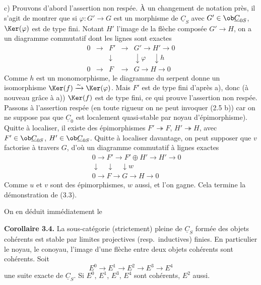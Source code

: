 c) Prouvons d'abord l'assertion non respée. À un changement de notation près, il s'agit de montrer que si $\varphi : G' \to G$ est un morphisme de $\underline{C}_S$ avec $G' \in \ob \underline{C}_{0S}$, $\Ker(\varphi)$ est de type fini. Notant $H'$ l'image de la flèche composée $G' \to H$, on a un diagramme commutatif dont les lignes sont exactes
\[
\begin{array}{ccccc}
0 & \longrightarrow & F' & \longrightarrow & G' \longrightarrow H' \longrightarrow 0 \\
& & \downarrow & & \downarrow \varphi \quad \downarrow h \\
0 & \longrightarrow & F & \longrightarrow & G \longrightarrow H \longrightarrow 0
\end{array}
\]
Comme $h$ est un monomorphisme, le diagramme du serpent donne un isomorphisme $\Ker(f) \xrightarrow{\sim} \Ker(\varphi)$. Mais $F'$ est de type fini d'après a), donc (à nouveau grâce à a)) $\Ker(f)$ est de type fini, ce qui prouve l'assertion non respée. Passons à l'assertion respée (en toute rigueur on ne peut invoquer (2.5 b)) car on ne suppose pas que $\underline{C}_0$ est localement quasi-stable par noyau d'épimorphisme). Quitte à localiser, il existe des épimorphismes $F' \twoheadrightarrow F$, $H' \twoheadrightarrow H$, avec $F' \in \ob \underline{C}_{0S}$, $H' \in \ob \underline{C}_{0S}$. Quitte à localiser davantage, on peut supposer que $v$ factorise à travers $G$, d'où un diagramme commutatif à lignes exactes
\[
\begin{array}{ccccc}
& & 0 \longrightarrow F' \longrightarrow F' \oplus H' \longrightarrow H' \longrightarrow 0 \\
& & \downarrow \quad \downarrow \quad \downarrow w \\
& & 0 \longrightarrow F \longrightarrow G \longrightarrow H \longrightarrow 0
\end{array}
\]
Comme $u$ et $v$ sont des épimorphismes, $w$ aussi, et l'on gagne. Cela termine la démonstration de (3.3).

On en déduit immédiatement le

\textbf{Corollaire 3.4.} La sous-catégorie (strictement) pleine de $\underline{C}_S$ formée des objets cohérents est stable par limites projectives (resp.\ inductives) finies. En particulier le noyau, le conoyau, l'image d'une flèche entre deux objets cohérents sont cohérents. Soit
\[
E^0 \longrightarrow E^1 \longrightarrow E^2 \longrightarrow E^3 \longrightarrow E^4
\]
une suite exacte de $\underline{C}_S$. Si $E^0$, $E^1$, $E^3$, $E^4$ sont cohérents, $E^2$ aussi.

